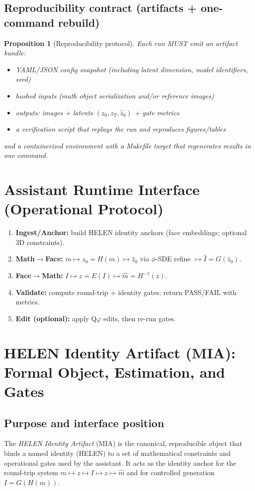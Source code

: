 \documentclass[12pt]{amsart}
\numberwithin{equation}{section}
\newtheorem{proposition}[definition]{Proposition}
\newcommand{\phiGR}{\varphi}
\begin{document}
\subsection{Reproducibility contract (artifacts + one-command rebuild)}
\begin{proposition}[Reproducibility protocol]
Each run MUST emit an artifact bundle:
\begin{itemize}
\item YAML/JSON config snapshot (including latent dimension, model identifiers, seed)
\item hashed inputs (math object serialization and/or reference images)
\item outputs: images + latents $(z_0,z_T,\hat z_0)$ + gate metrics
\item a verification script that replays the run and reproduces figures/tables
\end{itemize}
and a containerized environment with a Makefile target that regenerates results in one command.
\end{proposition}
\section{Assistant Runtime Interface (Operational Protocol)}
\begin{enumerate}[leftmargin=*]
\item \textbf{Ingest/Anchor:} build HELEN identity anchors (face embeddings; optional 3D constraints).
\item \textbf{Math$\to$Face:} $m\mapsto z_0=H(m)\mapsto \hat z_0$ via $\phi$-SDE refine $\mapsto \hat I=G(\hat z_0)$.
\item \textbf{Face$\to$Math:} $I\mapsto z=E(I)\mapsto \hat m=H^{-1}(z)$.
\item \textbf{Validate:} compute round-trip + identity gates; return PASS/FAIL with metrics.
\item \textbf{Edit (optional):} apply Q$\phiGR$ edits, then re-run gates.
\end{enumerate}

\section{HELEN Identity Artifact (MIA): Formal Object, Estimation, and Gates}

\subsection{Purpose and interface position}
The \emph{HELEN Identity Artifact} (MIA) is the canonical, reproducible object that
binds a named identity (\textsf{HELEN}) to a set of mathematical constraints and
operational gates used by the assistant. It acts as the identity anchor for the
round-trip system $m\mapsto z\mapsto I\mapsto z\mapsto \hat m$ and for controlled
generation $I=G(H(m))$.
\end{document}
